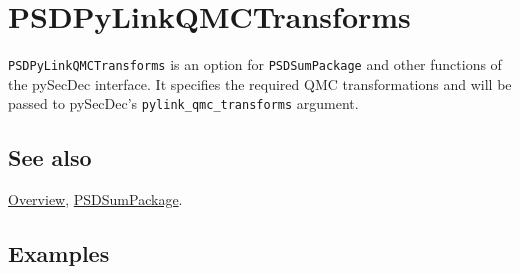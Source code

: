 \documentclass[../FeynHelpersManual.tex]{subfiles}
\begin{document}
\hypertarget{psdpylinkqmctransforms}{
\section{PSDPyLinkQMCTransforms}\label{psdpylinkqmctransforms}}

\texttt{PSDPyLinkQMCTransforms} is an option for \texttt{PSDSumPackage}
and other functions of the pySecDec interface. It specifies the required
QMC transformations and will be passed to pySecDec's
\texttt{pylink_qmc_transforms} argument.

\subsection{See also}

\hyperlink{toc}{Overview}, \hyperlink{psdsumpackage}{PSDSumPackage}.

\subsection{Examples}
\end{document}

